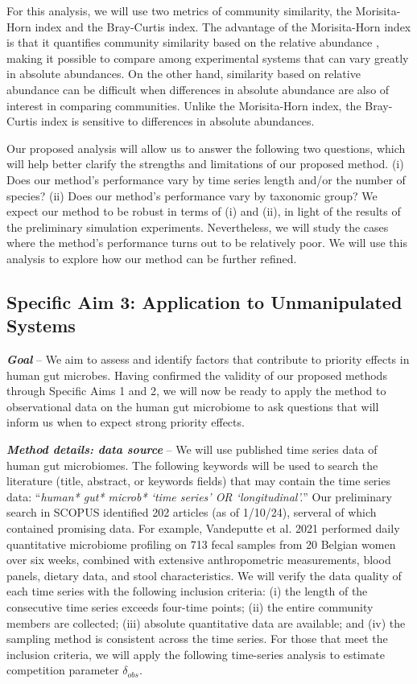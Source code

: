 \documentclass[12pt, class=article, crop=false]{standalone}
\begin{document}
For this analysis, we will use two metrics of community similarity, the Morisita-Horn index and the Bray-Curtis index.
The advantage of the Morisita-Horn index is that it quantifies community similarity based on the relative abundance \citep{magurran_biological_2011}, making it possible to compare among experimental systems that can vary greatly in absolute abundances.
On the other hand, similarity based on relative abundance can be difficult when differences in absolute abundance are also of interest in comparing communities.
Unlike the Morisita-Horn index, the Bray-Curtis index is sensitive to differences in absolute abundances\citep{magurran_biological_2011}.

Our proposed analysis will allow us to answer the following two questions, which will help better clarify the strengths and limitations of our proposed method.
(i) Does our method's performance vary by time series length and/or the number of species?
(ii) Does our method's performance vary by taxonomic group?
We expect our method to be robust in terms of (i) and (ii), in light of the results of the preliminary simulation experiments.
Nevertheless, we will study the cases where the method's performance turns out to be relatively poor.
We will use this analysis to explore how our method can be further refined.

\subsection*{Specific Aim 3: Application to Unmanipulated Systems}

\textbf{\textit{Goal}} -- 
We aim to assess and identify factors that contribute to priority effects in human gut microbes.
Having confirmed the validity of our proposed methods through Specific Aims 1 and 2, we will now be ready to apply the method to observational data on the human gut microbiome to ask questions that will inform us when to expect strong priority effects.

\textit{\textbf{Method details: data source}} --
We will use published time series data of human gut microbiomes.
The following keywords will be used to search the literature (title, abstract, or keywords fields) that may contain the time series data: ``\textit{human* gut* microb* `time series' OR `longitudinal'.}''
Our preliminary search in SCOPUS identified 202 articles (as of 1/10/24), serveral of which contained promising data.
For example, Vandeputte et al. 2021 \citep{vandeputte_temporal_2021} performed daily quantitative microbiome profiling on 713 fecal samples from 20 Belgian women over six weeks, combined with extensive anthropometric measurements, blood panels, dietary data, and stool characteristics. 
We will verify the data quality of each time series with the following inclusion criteria: (i) the length of the consecutive time series exceeds four-time points; (ii) the entire community members are collected; (iii) absolute quantitative data are available; and (iv) the sampling method is consistent across the time series.
For those that meet the inclusion criteria, we will apply the following time-series analysis to estimate competition parameter $\delta_{obs}$.
\end{document}
